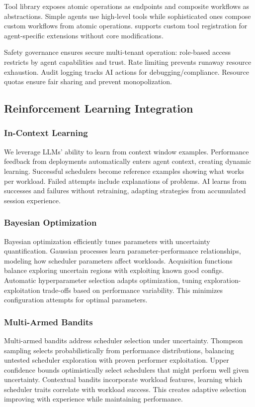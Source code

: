 Tool library exposes atomic operations as endpoints and composite workflows as abstractions. Simple agents use high-level tools while sophisticated ones compose custom workflows from atomic operations. \sys supports custom tool registration for agent-specific extensions without core modifications.

Safety governance ensures secure multi-tenant operation: role-based access restricts by agent capabilities and trust. Rate limiting prevents runaway resource exhaustion. Audit logging tracks AI actions for debugging/compliance. Resource quotas ensure fair sharing and prevent monopolization.

\subsection{Reinforcement Learning Integration}

\subsubsection{In-Context Learning}
We leverage LLMs' ability to learn from context window examples. Performance feedback from deployments automatically enters agent context, creating dynamic learning. Successful schedulers become reference examples showing what works per workload. Failed attempts include explanations of problems. AI learns from successes and failures without retraining, adapting strategies from accumulated session experience.

\subsubsection{Bayesian Optimization}
Bayesian optimization efficiently tunes parameters with uncertainty quantification. Gaussian processes learn parameter-performance relationships, modeling how scheduler parameters affect workloads. Acquisition functions balance exploring uncertain regions with exploiting known good configs. Automatic hyperparameter selection adapts optimization, tuning exploration-exploitation trade-offs based on performance variability. This minimizes configuration attempts for optimal parameters.

\subsubsection{Multi-Armed Bandits}
Multi-armed bandits address scheduler selection under uncertainty. Thompson sampling selects probabilistically from performance distributions, balancing untested scheduler exploration with proven performer exploitation. Upper confidence bounds optimistically select schedulers that might perform well given uncertainty. Contextual bandits incorporate workload features, learning which scheduler traits correlate with workload success. This creates adaptive selection improving with experience while maintaining performance.

